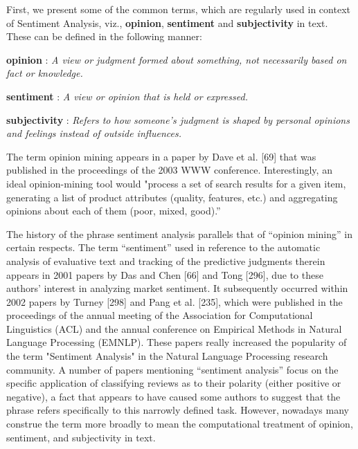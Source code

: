 First, we present some of the common terms, which are regularly used in context of Sentiment Analysis, viz., \textbf{opinion}, \textbf{sentiment} and \textbf{subjectivity} in text. These can be defined in the following manner:
\newline

\textbf{opinion} : \textit{A view or judgment formed about something, not necessarily based on fact or knowledge.}
\newline

\textbf{sentiment} : \textit{A view or opinion that is held or expressed.}
\newline

\textbf{subjectivity} : \textit{Refers to how someone's judgment is shaped by personal opinions and feelings instead of outside influences. }
\newline

The term opinion mining appears in a paper by Dave et al. [69] that was published in the proceedings of the 2003 WWW conference. Interestingly, an ideal opinion-mining tool would "process a set of search results for a given item, generating a list of product attributes (quality, features, etc.) and aggregating opinions about each of them (poor, mixed, good).” 
\newline

The history of the phrase sentiment analysis parallels that of “opinion mining” in certain respects. The term “sentiment” used in reference to the automatic analysis of evaluative text and tracking of the predictive judgments therein appears in 2001 papers by Das and Chen [66] and Tong [296], due to these authors’ interest in analyzing market sentiment. It subsequently occurred within 2002 papers by Turney [298] and Pang et al. [235], which were published in the proceedings of the annual meeting of the Association for Computational Linguistics (ACL) and the annual conference on Empirical Methods in Natural Language Processing (EMNLP). These papers really increased the popularity  of the term "Sentiment Analysis" in the Natural Language Processing research community. A number of papers mentioning “sentiment analysis” focus on the specific application of classifying reviews as to their polarity (either positive or negative), a fact that appears to have caused some authors to suggest that the phrase refers specifically to this narrowly defined task. However, nowadays many construe the term more broadly to mean the computational treatment of opinion, sentiment, and subjectivity in text.
\newline

